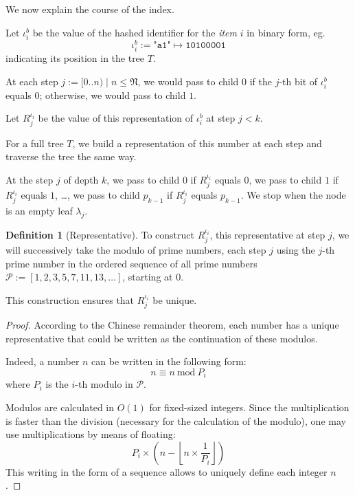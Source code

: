\documentclass[twoside,twocolumn]{article}
\newcommand{\floor}[1]{\left\lfloor #1 \right\rfloor}
\newcommand{\mod}[1]{\ \mathrm{mod}\ #1}
\theoremstyle{definition}
\newtheorem{definition}{Definition}
\theoremstyle{remark}
\begin{document}
We now explain the course of the index.

Let $\iota_i^b$ be the value of the hashed identifier for the \emph{item} $i$ in binary form, eg. $$
    \iota_i^b := \texttt{"a1"} \mapsto \texttt{10100001}
$$
indicating its position in the tree $T$.

At each step $j := [0..n) \mid n \leq \mathfrak{N}$, we would pass to child $0$ if the $j$-th bit of $\iota_i^b$ equals $0$; otherwise, we would 
pass to child $1$.

Let $R_j^{\iota_i}$ be the value of this representation of $\iota_i^b$ at step $j < k$.

For a full tree $T$, we build a representation of this number at each step and traverse the tree the same way. 

At the step $j$ of depth $k$, we pass to child $0$ if $R_j^{\iota_i}$ equals $0$, we pass to child $1$ if $R_j^{\iota_i}$ equals $1$, \dots, we 
pass to child $p_{k-1}$ if $R_j^{\iota_i}$ equals $p_{k-1}$.
We stop when the node is an empty leaf $\lambda_j$.

\begin{definition}[Representative]
    \label{representative}
    To construct $R_j^{\iota_i}$, this representative at step $j$, we will successively take the modulo of prime numbers, each step $j$ using the 
    $j$-th prime number in the ordered sequence of all prime numbers $\mathcal{P} := [1, 2, 3, 5, 7, 11, 13, \dots]$, starting at $0$.

    This construction ensures that $R_j^{\iota_i}$ be unique.

    \begin{proof}
        According to the Chinese remainder theorem\cite{gauss}, each number has a unique representative that could be written as the continuation 
        of these modulos.

        Indeed, a number $n$ can be written in the following form:$$
            n \equiv n \mod P_i
        $$
        where $P_i$ is the $i$-th modulo in $\mathcal{P}$.

        Modulos are calculated in $O(1)$ for fixed-sized integers.
        Since the multiplication is faster than the division (necessary for the calculation of the modulo), one may use 
        multiplications by means of floating:$$
            P_i \times \left( n - \floor{n \times \frac{1}{P_i}} \right)
        $$
        This writing in the form of a sequence allows to uniquely define each integer $n$.
    \end{proof}
\end{definition}
\end{document}
